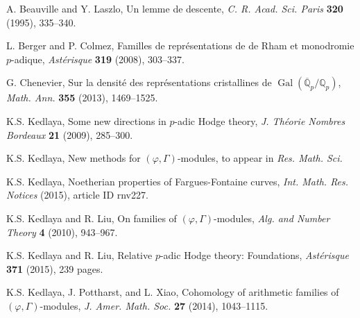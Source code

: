 \documentclass[12pt]{amsart}
\theoremstyle{definition}
\numberwithin{equation}{theorem}
\newcommand{\QQ}{\mathbb{Q}}
\DeclareMathOperator{\Gal}{Gal}
\begin{document}
\begin{thebibliography}{99}

A. Beauville and Y. Laszlo, Un lemme de descente, \textit{C. R. Acad. Sci. Paris} \textbf{320} (1995), 335--340.

L. Berger and P. Colmez, Familles de repr\'esentations de de Rham et monodromie $p$-adique, \textit{Ast\'erisque} \textbf{319} (2008), 303--337.

G. Chenevier, Sur la densit\'e des repr\'esentations cristallines de
$\Gal(\overline{\QQ}_p/\QQ_p)$, \textit{Math. Ann.} \textbf{355} (2013), 1469--1525.

K.S. Kedlaya, Some new directions in $p$-adic Hodge theory, \textit{J. Th\'eorie Nombres Bordeaux} \textbf{21} (2009), 285--300.

K.S. Kedlaya, New methods for $(\varphi, \Gamma)$-modules,
to appear in \textit{Res. Math. Sci.}

K.S. Kedlaya, Noetherian properties of Fargues-Fontaine curves,
\textit{Int. Math. Res. Notices} (2015), article ID rnv227. 

K.S. Kedlaya and R. Liu, On families of $(\varphi, \Gamma)$-modules,
\textit{Alg. and Number Theory} \textbf{4} (2010), 943--967.

K.S. Kedlaya and R. Liu, Relative $p$-adic Hodge theory: Foundations,
\textit{Ast\'erisque} \textbf{371} (2015), 239 pages. 

K.S. Kedlaya, J. Pottharst, and L. Xiao, Cohomology of arithmetic families of $(\varphi, \Gamma)$-modules, \textit{J. Amer. Math. Soc.}  \textbf{27} (2014), 1043--1115. 

\end{thebibliography}
\end{document}

